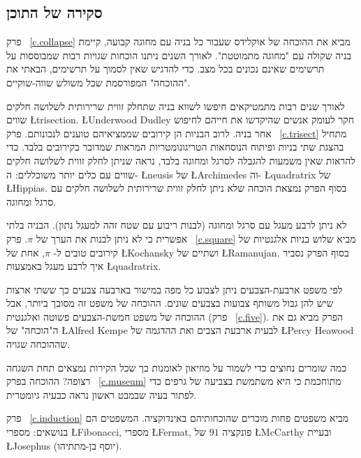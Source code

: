 \subsection*{סקירה של התוכן}


פרק~%
\ref{c.collapse}
מביא את ההוכחה של אוקלידס שעבור כל בניה עם מחוגה קבועה, קיימת בניה שקולה עם "מחוגה מתמוטטת". לאורך השנים ניתנו הוכחות שגויות רבות שמבוססות על תרשימים שאינם נכונים בכל מצב. כדי להדגיש שאין לסמוך על תרשימים, הבאתי את "ההוכחה" המפורסמת שכל משולש שווה-שוקיים.

לאורך שנים רבות מתמטיקאים חיפשו לשווא בניה שתחלק זווית שרירותית לשלושה חלקים שווים
\L{trisection}.
\L{Underwood Dudley}
חקר לעומק אנשים שהיקדשו את חייהם לחיפוש אחר בניה. לרוב הבניות הן קירובים שממציאיהם טוענים לנכונותם. פרק~%
\ref{c.trisect}
מתחיל בהצגת שתי בניות ופיתוח הנוסחאות הטריגונומטריות המראות שמדובר בקירובים בלבד. כדי להראות שאין משמעות להגבלה לסרגל ומחוגה בלבד, נראה שניתן לחלק זווית לשלושה חלקים שווים עם כלים יותר משוכללים: ה-%
\L{neusis}
של
\L{Archimedes}
וה-%
\L{quadratrix}
של
\L{Hippias}.
בסוף הפרק נמצאת הוכחה שלא ניתן לחלק זווית שרירותית לשלושה חלקים עם סרגל ומחוגה.

לא ניתן לרבע מעגל עם סרגל ומחוגה (לבנות ריבוע עם שטח זהה למעגל נתון). הבניה בלתי אפשרית כי לא ניתן לבנות את הערך של 
$\pi$.
פרק~%
\ref{c.square}
מביא שלוש בניות אלגנטיות של קירובים טובים ל-%
$\pi$,
אחת של
\L{Kochansky}
ושתיים של
\L{Ramanujan}.
בסוף הפרק נסביר איך לרבע מעגל באמצעות
\L{quadratrix}.


לפי משפט ארבעת-הצבעים ניתן לצבוע כל מפה במישור בארבעה צבעים כך ששתי ארצות שיש להן גבול משותף צבועות בצבעים שונים. ההוכחה של משפט זה מסובך ביותר, אבל ההוכחה של משפט חמשת-הצבעים פשוטה ואלגנטית (פרק%
~\ref{c.five}).
הפרק מביא גם את ה"הוכחה" של 
\L{Alfred Kempe}
לבעית ארבעת הצבים ואת ההדגמה של 
\L{Percy Heawood}
שההוכחה שגויה.


כמה שומרים נחוצים כדי לשמור על מוזיאון לאומנות כך שכל הקירות נמצאים תחת השגחה רצופה? ההוכחה בפרק%
~\ref{c.museum}
מתוחכמת כי היא משתמשת בצביעה של גרפים כדי לפתור בעיה שבמבט ראשון נראה כבעיה גיומטרית.


פרק~%
\ref{c.induction}
מביא משפטים פחות מוכרים שהוכחותיהם באינדוקציה. המשפטים הם בנושאים: מספרי 
\L{Fibonacci}, 
מספרי
\L{Fermat},
פונקציה 
$91$
של 
\L{McCarthy}
ובעיית
\L{Josephus}
(יוסף בן-מתתיהו).

